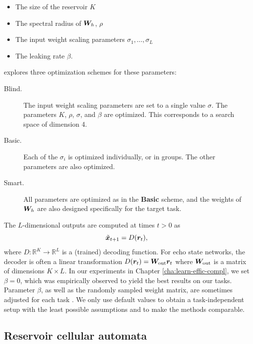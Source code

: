 \begin{itemize}
  \item The size of the reservoir $K$
  \item The spectral radius of ${\bm{W}}_{h}$, $\rho$
  \item The input weight scaling parameters $\sigma_{1}, \ldots, \sigma_{L}$
  \item The leaking rate $\beta$.
\end{itemize}

\textcite{jaegerLongShortTermMemory2012} explores three
optimization schemes for these parameters:
\begin{description}
  \item[Blind.] The input weight scaling parameters are set to a single
        value $\sigma$. The parameters $K$, $\rho$, $\sigma$, and $\beta$ are
        optimized. This corresponds to a search space of dimension 4.
  \item[Basic.] Each of the $\sigma_{i}$ is optimized individually, or in
        groups. The other parameters are also optimized.
  \item[Smart.] All parameters are optimized as in the \textbf{Basic}
        scheme, and the weights of ${\bm{W}}_{h}$ are also designed specifically for
        the target task.
\end{description}


The $L$-dimensional outputs are computed at times $t > 0$ as
\begin{equation}
  \label{eq:esn-res}
\tilde{{\bm{x}}}_{t+ 1} = D({\bm{r}}_{t}),
\end{equation}
where $D: \mathbb{R}^{K} \rightarrow \mathbb{R}^{L}$ is a (trained) decoding
function. For echo state networks, the decoder is often a linear transformation
$D({\bm{r}}_{t}) = {\bm{W}}_{\text{out}} {\bm{r}}_{t}$ where ${\bm{W}}_{\text{out}}$ is a
matrix of dimensions $K \times L$. In our experiments in Chapter \ref{cha:learn-effic-compl}, 
we set $\beta = 0$, which
was empirically observed to yield the best results on our tasks. Parameter
$\beta$, as well as the randomly sampled weight matrix, are sometimes adjusted for
each task \parencite{jaegerLongShortTermMemory2012}. We only use default values
to obtain a task-independent setup with the least possible assumptions and to make
the methods comparable.

\subsection{Reservoir cellular automata\label{sec:app-ca-res}}

